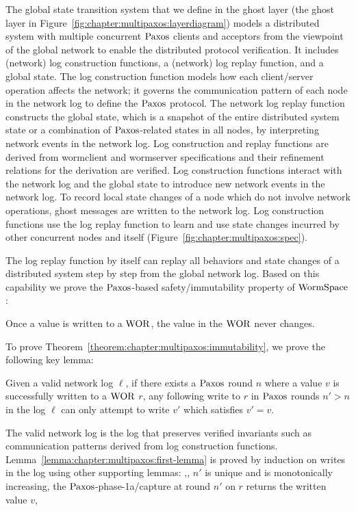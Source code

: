 The global state transition system that we define in the ghost layer (the ghost layer in Figure~\ref{fig:chapter:multipaxos:layerdiagram}) 
models a distributed system with multiple concurrent $\mathrm{Paxos}$ clients and acceptors from the viewpoint of the global network to enable the distributed protocol verification. 
It includes (network) log construction functions, a (network) log replay function, and a global state.
The log construction function models how each client/server operation affects the network; 
it governs the communication pattern of each node in the network log to define the $\mathrm{Paxos}$ protocol. 
The network log replay function constructs the global state, 
which is a snapshot of the entire distributed system state or a combination of $\mathrm{Paxos}$-related states in all nodes,
 by interpreting network events in the network log. Log construction and replay functions are derived from wormclient and wormserver specifications and their refinement relations for the derivation are verified. 
Log construction functions interact with the network log and the global state to introduce new network events in the network log. 
To record local state changes of a node which do not involve network operations, ghost messages are written 
to the network log. 
Log construction functions use the log replay function to learn and use state changes incurred by other concurrent nodes and itself (Figure~\ref{fig:chapter:multipaxos:spec}).


The log replay function by itself can replay all behaviors and state changes of a distributed system step by step from the global network log. Based on this capability we prove the $\mathrm{Paxos}$-based safety/immutability property of $\mathrm{WormSpace}$:
\begin{theorem}[Immutability]
\label{theorem:chapter:multipaxos:immutability}
 Once a value is written to a $\mathrm{WOR}$, the value in the $\mathrm{WOR}$ never changes.
 \end{theorem}
To prove Theorem~\ref{theorem:chapter:multipaxos:immutability}, we prove the following key lemma: 
\begin{lemma}
\label{lemma:chapter:multipaxos:first-lemma}
 Given a valid network log $\ell$, if there exists a $\mathrm{Paxos}$ round $n$ where a value $v$ is successfully written to a $\mathrm{WOR}$ $r$, any following write to $r$ in $\mathrm{Paxos}$ rounds $n' > n$ in the log $\ell$
can only attempt to write $v'$ which satisfies $v' = v$.
\end{lemma}
The valid network log is the log that preserves verified invariants such as communication patterns derived from log construction functions.
Lemma~\ref{lemma:chapter:multipaxos:first-lemma} is proved by induction on writes in the log using other supporting lemmas: \eg,, $n'$ is unique and is monotonically increasing, the $\mathrm{Paxos}$-phase-1a/capture at round $n'$ on $r$ returns the written value $v$, \etc

